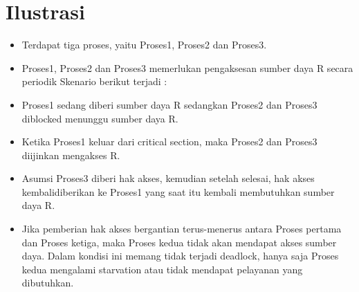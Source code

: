 \section{Ilustrasi}
\begin {itemize}
	\item Terdapat tiga proses, yaitu Proses1, Proses2 dan Proses3.
	\item Proses1, Proses2 dan Proses3 memerlukan pengaksesan sumber daya R secara periodik Skenario berikut terjadi :
	\item Proses1 sedang diberi sumber daya R sedangkan Proses2 dan Proses3 diblocked menunggu sumber daya R.
	\item Ketika Proses1 keluar dari critical section, maka Proses2 dan Proses3 diijinkan mengakses R.
	\item Asumsi Proses3 diberi hak akses, kemudian setelah selesai, hak akses kembalidiberikan ke Proses1 yang saat itu kembali membutuhkan sumber daya R.
	\item Jika pemberian hak akses bergantian terus-menerus antara Proses pertama dan Proses ketiga,  maka Proses kedua tidak akan mendapat akses sumber daya. Dalam kondisi ini memang tidak terjadi deadlock, hanya saja Proses kedua mengalami starvation atau tidak mendapat pelayanan yang dibutuhkan.
\end{itemize}
 
